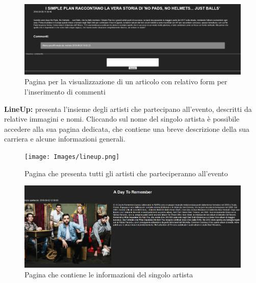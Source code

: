 \documentclass[10pt, a4paper]{article}
\begin{document}
\begin{figure}[h!]
  \centering
  \includegraphics[width=1\textwidth]{Images/articolo.png}
  \caption{Pagina per la visualizzazione di un articolo con relativo form per l'inserimento di commenti}
  \label{fig:articolo}
\end{figure}
\newpage
\begin{flushleft} \textbf{LineUp: }presenta l'insieme degli artisti che partecipano all'evento, descritti da relative immagini e nomi. Cliccando sul nome del singolo artista è possibile accedere alla sua pagina dedicata, che contiene una breve descrizione della sua carriera e alcune informazioni generali. \end{flushleft}
\begin{figure}[h!]
  \centering
  \texttt{[image: Images/lineup.png]}
  \caption{Pagina che presenta tutti gli artisti che parteciperanno all'evento}
  \label{fig:lineup}
\end{figure}
\begin{figure}[h!]
  \centering
  \includegraphics[width=1\textwidth]{Images/artista.png}
  \caption{Pagina che contiene le informazioni del singolo artista}
  \label{fig:artista}
\end{figure}
\end{document}
